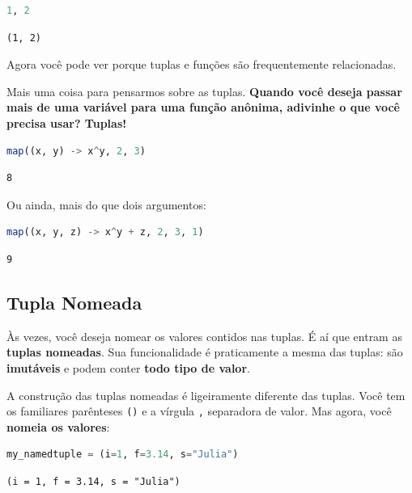 \documentclass[
  notoc %
]{tufte-book}
\newcommand{\passthrough}[1]{#1}
\begin{document}
\begin{lstlisting}[language=Julia]
1, 2
\end{lstlisting}

\begin{lstlisting}[language=Output]
(1, 2)
\end{lstlisting}

Agora você pode ver porque tuplas e funções são frequentemente
relacionadas.

Mais uma coisa para pensarmos sobre as tuplas. \textbf{Quando você
deseja passar mais de uma variável para uma função anônima, adivinhe o
que você precisa usar? Tuplas!}

\begin{lstlisting}[language=Julia]
map((x, y) -> x^y, 2, 3)
\end{lstlisting}

\begin{lstlisting}[language=Output]
8
\end{lstlisting}

Ou ainda, mais do que dois argumentos:

\begin{lstlisting}[language=Julia]
map((x, y, z) -> x^y + z, 2, 3, 1)
\end{lstlisting}

\begin{lstlisting}[language=Output]
9
\end{lstlisting}

\hypertarget{sec:namedtuple}{%
\subsection{Tupla Nomeada}\label{sec:namedtuple}}

Às vezes, você deseja nomear os valores contidos nas tuplas. É aí que
entram as \textbf{tuplas nomeadas}. Sua funcionalidade é praticamente a
mesma das tuplas: são \textbf{imutáveis} e podem conter \textbf{todo
tipo de valor}.

A construção das tuplas nomeadas é ligeiramente diferente das tuplas.
Você tem os familiares parênteses \passthrough{\lstinline!()!} e a
vírgula \passthrough{\lstinline!,!} separadora de valor. Mas agora, você
\textbf{nomeia os valores}:

\begin{lstlisting}[language=Julia]
my_namedtuple = (i=1, f=3.14, s="Julia")
\end{lstlisting}

\begin{lstlisting}[language=Output]
(i = 1, f = 3.14, s = "Julia")
\end{lstlisting}
\end{document}
